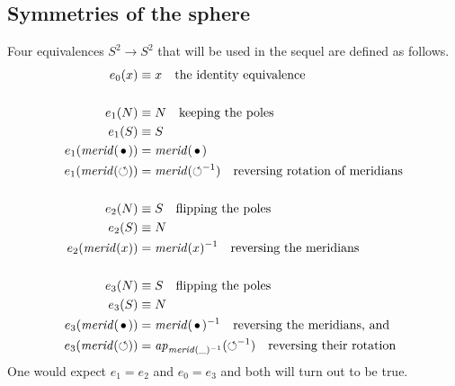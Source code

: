 \documentclass[english,a4]{article}
\newcommand{\Sp}{{S^2}}%
\newcommand{\mrd}{\mathit{merid}}%
\begin{document}





\subsection{Symmetries of the sphere}
\label{sec:symmetries-sphere}

Four equivalences $\Sp\to\Sp$ that will be used in the sequel are
defined as follows. 
\begin{align}
  \label{eq:S2symmetries}
  e_0(x)&\jdeq x \quad\text{the identity equivalence}\\
\nonumber\\
  e_1(N)&\jdeq N \quad\text{keeping the poles}\\
  e_1(S)&\jdeq S\\
  e_1(\mrd(\base))&= \mrd(\base)\\
  e_1(\mrd(\Sloop))&= \mrd(\Sloop^{-1})\quad\text{reversing rotation of meridians}\\
\nonumber\\
  e_2(N)&\jdeq S \quad\text{flipping the poles}\\
  e_2(S)&\jdeq N\\
  e_2(\mrd(x))&= \mrd(x)^{-1}\quad\text{reversing the meridians}\\
\nonumber\\
  e_3(N)&\jdeq S \quad\text{flipping the poles}\\
  e_3(S)&\jdeq N\\
  e_3(\mrd(\base))&= \mrd(\base)^{-1}\quad\text{reversing the meridians, and}\\
  e_3(\mrd(\Sloop))&= \ap{\mrd(\_)^{-1}}(\Sloop^{-1})\quad\text{reversing their rotation}
\end{align}
One would expect $e_1=e_2$ and $e_0=e_3$ and both will turn out to be true.
\end{document}
